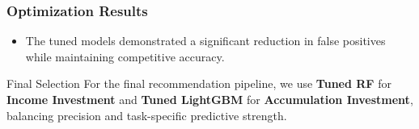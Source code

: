 \documentclass[aspectratio=169]{beamer}
\begin{document}
\begin{frame}
	\frametitle{Optimization Results}
	\begin{itemize}
		\item The tuned models demonstrated a significant reduction in false positives while maintaining competitive accuracy.
	\end{itemize}

	\begin{table}
		\centering
	\end{table}

	\vspace{0.2cm}
	\begin{block}{Final Selection}
		For the final recommendation pipeline, we use \textbf{Tuned RF} for \textbf{Income Investment} and \textbf{Tuned LightGBM} for \textbf{Accumulation Investment}, balancing precision and task-specific predictive strength.
	\end{block}
\end{frame}
\end{document}

